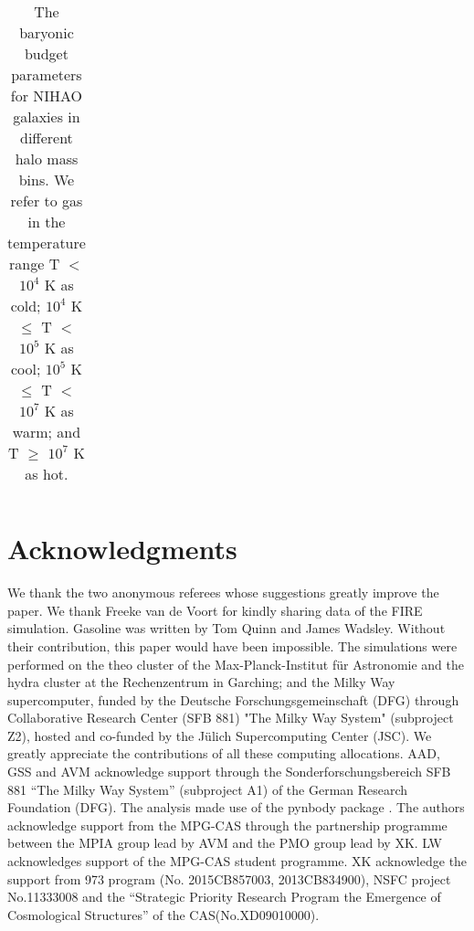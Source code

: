 \documentclass[useAMS,usenatbib]{mn2e}
\begin{document}
\begin{table*}
  \caption{The baryonic budget parameters for NIHAO galaxies
    in different halo  mass bins. We refer to gas in the temperature range  T
  $<$ $10^4$ K as cold; $10^4$ K $\leqslant$ T $<$ $10^5$ K as cool;
  $10^5$ K $\leqslant$ T $<$ $10^7$ K as warm;  and T $\geqslant$
  $10^7$ K as hot.}
\begin{center}
\begin{tabular}{ccccc}
\hline

\hline
\end{tabular}
\label{tab:comparison}
\end{center}
\end{table*}





\section*{Acknowledgments} 

We thank the two anonymous referees whose suggestions greatly  improve
the paper.  We thank Freeke van de Voort for kindly sharing data
  of the FIRE simulation.  {\sc Gasoline} was written by Tom Quinn
and James Wadsley. Without their contribution, this paper would have
been impossible.
%
The simulations were performed on the {\sc theo} cluster of the
Max-Planck-Institut f\"ur Astronomie and the {\sc hydra} cluster at
the Rechenzentrum in Garching; and the Milky Way supercomputer, funded
by the Deutsche Forschungsgemeinschaft (DFG) through Collaborative
Research Center (SFB 881) "The Milky Way System" (subproject Z2),
hosted and co-funded by the J\"ulich Supercomputing Center (JSC). We
greatly appreciate the contributions of all these computing
allocations.
%
AAD, GSS and AVM acknowledge support through the
Sonderforschungsbereich SFB 881 “The Milky Way System” (subproject A1)
of the German Research Foundation (DFG).  The analysis made use of the
pynbody package \citep{Pontzen13}.
%
The authors acknowledge support from the MPG-CAS through the
partnership programme between the MPIA group lead by AVM and the PMO
group lead by XK.
%
LW acknowledges support of the MPG-CAS student programme.
%
XK acknowledge the support from 973 program (No. 2015CB857003,
2013CB834900), NSFC project No.11333008 and the ``Strategic Priority
Research Program the Emergence of Cosmological Structures'' of the
CAS(No.XD09010000).


\end{document}
